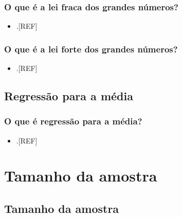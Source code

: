 \documentclass[
]{book}
\providecommand{\tightlist}{%
  \setlength{\itemsep}{0pt}\setlength{\parskip}{0pt}}
\begin{document}
\hypertarget{o-que-uxe9-a-lei-fraca-dos-grandes-nuxfameros}{%
\subsection{O que é a lei fraca dos grandes números?}\label{o-que-uxe9-a-lei-fraca-dos-grandes-nuxfameros}}

\begin{itemize}
\tightlist
\item
  .{[}REF{]}
\end{itemize}

\hypertarget{o-que-uxe9-a-lei-forte-dos-grandes-nuxfameros}{%
\subsection{O que é a lei forte dos grandes números?}\label{o-que-uxe9-a-lei-forte-dos-grandes-nuxfameros}}

\begin{itemize}
\tightlist
\item
  .{[}REF{]}
\end{itemize}

\hypertarget{regressao-media}{%
\section{Regressão para a média}\label{regressao-media}}

\hypertarget{o-que-uxe9-regressuxe3o-para-a-muxe9dia}{%
\subsection{O que é regressão para a média?}\label{o-que-uxe9-regressuxe3o-para-a-muxe9dia}}

\begin{itemize}
\tightlist
\item
  .{[}REF{]}
\end{itemize}

\hypertarget{tamanho-amostra}{%
\chapter{\texorpdfstring{\textbf{Tamanho da amostra}}{Tamanho da amostra}}\label{tamanho-amostra}}

\hypertarget{tamanho-da-amostra}{%
\section{Tamanho da amostra}\label{tamanho-da-amostra}}
\end{document}
